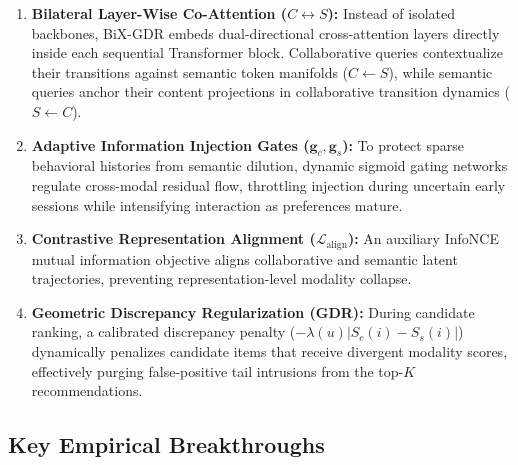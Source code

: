 \begin{enumerate}[leftmargin=*]
    \item \textbf{Bilateral Layer-Wise Co-Attention ($C \leftrightarrow S$):} Instead of isolated backbones, BiX-GDR embeds dual-directional cross-attention layers directly inside each sequential Transformer block. Collaborative queries contextualize their transitions against semantic token manifolds ($C \leftarrow S$), while semantic queries anchor their content projections in collaborative transition dynamics ($S \leftarrow C$).
    \item \textbf{Adaptive Information Injection Gates ($\mathbf{g}_c, \mathbf{g}_s$):} To protect sparse behavioral histories from semantic dilution, dynamic sigmoid gating networks regulate cross-modal residual flow, throttling injection during uncertain early sessions while intensifying interaction as preferences mature.
    \item \textbf{Contrastive Representation Alignment ($\mathcal{L}_{\text{align}}$):} An auxiliary InfoNCE mutual information objective aligns collaborative and semantic latent trajectories, preventing representation-level modality collapse.
    \item \textbf{Geometric Discrepancy Regularization (GDR):} During candidate ranking, a calibrated discrepancy penalty ($-\lambda(u) |S_c(i) - S_s(i)|$) dynamically penalizes candidate items that receive divergent modality scores, effectively purging false-positive tail intrusions from the top-$K$ recommendations.
\end{enumerate}

\subsection{Key Empirical Breakthroughs}
\label{sec:intro_results}

